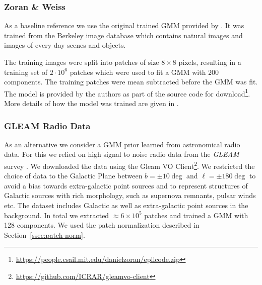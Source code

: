 \documentclass[twocolumn, lineno]{aastex631}
\begin{document}
    \subsubsection{Zoran \& Weiss}
    As a baseline reference we use the original trained GMM provided by \cite{Zoran2011}. It was trained from the Berkeley image database \citep{Martin2001} which contains natural images and images of every day scenes and objects. 
    
    The training images were split into patches of size $8\times8$ pixels, resulting in a training set of $2 \cdot 10^{6}$ patches which were used to fit a GMM with 200 components. The training patches were mean subtracted before the GMM was fit. The model is provided by the authors as part of the source code for download\footnote{\url{https://people.csail.mit.edu/danielzoran/epllcode.zip}}. More details of how the model was trained are given in \citet{Zoran2011}.
    
    \subsubsection{GLEAM Radio Data}
    \label{sssec:gleam-radio-data}
    As an alternative we consider a GMM prior learned from astronomical radio data. For this we relied on high signal to noise radio data from the \textit{GLEAM} survey \citep{HurleyWalker2022}. We downloaded the data using the Gleam VO Client\footnote{\url{https://github.com/ICRAR/gleamvo-client}}. We restricted the choice of data to the Galactic Plane between $b=\pm10\deg$ and $\ell = \pm180\deg$ to avoid a bias towards extra-galactic point sources and to represent structures of Galactic sources with rich morphology, such as supernova remnants, pulsar winds etc. The dataset includes Galactic as well as extra-galactic point sources in the background. In total we extracted $\approx 6 \times 10^5$ patches and trained a GMM with 128 components. We used the patch normalization described in Section~\ref{ssec:patch-norm}.
\end{document}
